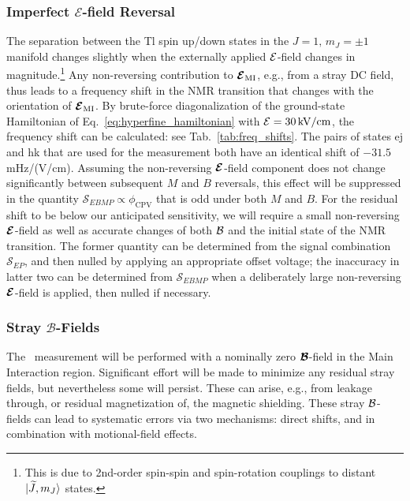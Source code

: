 \subsubsection{Imperfect \texorpdfstring{$\mathcal{E}$}{E}-field Reversal}
The separation between the Tl spin up/down states in the $J=1,\,m_J=\pm1$ manifold changes slightly when the externally applied $\mathcal{E}$-field changes in magnitude.\footnote{This is due to 2nd-order spin-spin and spin-rotation couplings to distant $|\widetilde{J},m_J\rangle$ states.} Any non-reversing contribution to $\bm{\mathcal{E}}_\mathrm{MI}$, e.g., from a stray DC field, thus leads to a  frequency shift in the NMR transition that changes with the orientation of $\bm{\mathcal{E}}_\mathrm{MI}$. By brute-force diagonalization of the ground-state Hamiltonian of Eq.~\ref{eq:hyperfine_hamiltonian} with $\mathcal{E} = 30\,\mathrm{kV/cm}$, the frequency shift can be calculated: see Tab.~\ref{tab:freq_shifts}. The pairs of states ej and hk that are used for the measurement both have an identical shift of $-31.5\,$mHz/(V/cm).  Assuming the non-reversing $\bm{\mathcal{E}}$-field component does not change significantly between subsequent $M$ and $B$ reversals, this effect will be suppressed in the quantity $\mathcal{S}_{EBMP} \propto \phi_\mathrm{CPV}$ that is odd under both $M$ and $B$. For the residual shift to be below our anticipated sensitivity, we will require a small non-reversing $\bm{\mathcal{E}}$-field as well as accurate changes of both $\mathcal{B}$ and the initial state of the NMR transition. The former quantity can be determined from the signal combination $\mathcal{S}_{EP}$, and then nulled by applying an appropriate offset voltage; the inaccuracy in latter two can be determined from $\mathcal{S}_{EBMP}$ when a deliberately large non-reversing $\bm{\mathcal{E}}$-field is applied, then nulled if necessary. 

\subsubsection{Stray \texorpdfstring{$\mathcal{B}$}{B}-Fields}

The \CENTREX\ measurement will be performed with a nominally zero $\bm{\mathcal{B}}$-field in the Main Interaction region. Significant effort will be made to minimize any residual stray fields, but nevertheless some will persist. These can arise, e.g., from leakage through, or residual magnetization of, the magnetic shielding. These stray $\mathcal{B}$-fields can lead to systematic errors via two mechanisms: direct shifts, and in combination with motional-field effects.

